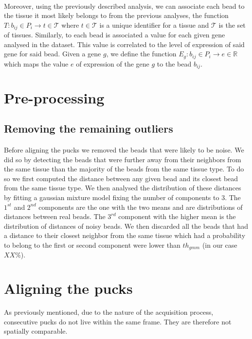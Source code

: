 \documentclass[10pt,a4paper]{article}
\begin{document}
\paragraph{}Moreover, using the previously described analysis, we can associate each bead to the tissue it most likely belongs to from the previous analyses, the function \(T:b_{ij}\in P_i\rightarrow t\in\mathcal{T}\) where \(t\in\mathcal{T}\) is a unique identifier for a tissue and \(\mathcal{T}\) is the set of tissues.
Similarly, to each bead is associated a value for each given gene analysed in the dataset.
This value is correlated to the level of expression of said gene for said bead.
Given a gene \(g\), we define the function \(E_g:b_{ij}\in P_i\rightarrow e\in\mathbb{R}\) which maps the value \(e\) of expression of the gene \(g\) to the bead \(b_{ij}\).
%
\section{Pre-processing}
\subsection{Removing the remaining outliers}
\paragraph{}Before aligning the pucks we removed the beads that were likely to be noise.
We did so by detecting the beads that were further away from their neighbors from the same tissue than the majority of the beads from the same tissue type.
To do so we first computed the distance between any given bead and its closest bead from the same tissue type.
We then analysed the distribution of these distances by fitting a gaussian mixture model fixing the number of components to 3.
The \(1^{st}\) and \(2^{nd}\) components are the one with the two means and are distributions of distances between real beads.
The \(3^{rd}\) component with the higher mean is the distribution of distances of noisy beads.
We then discarded all the beads that had a distance to their closest neighbor from the same tissue which had a probability to belong to the first or second component were lower than \(th_{gmm}\) (in our case \({XX}\%\)).
\section{Aligning the pucks}
\paragraph{}As previously mentioned, due to the nature of the acquisition process, consecutive pucks do not live within the same frame.
They are therefore not spatially comparable.
\end{document}
